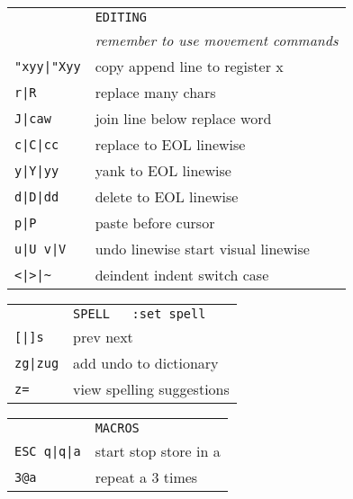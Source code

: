 \begin{tabular}{ll}
&\texttt{EDITING}\\
&\emph{remember to use movement commands}\\
\texttt{"xyy|"Xyy}&copy \textbar{} append line to register x\\
\texttt{r|R}& replace \textbar{} many chars\\
\texttt{J|caw}& join line below \textbar{} replace word\\
\texttt{c|C|cc}& replace \textbar{} to EOL \textbar{} linewise\\
\texttt{y|Y|yy}& yank \textbar{} to EOL \textbar{} linewise\\
\texttt{d|D|dd}& delete \textbar{} to EOL \textbar{} linewise\\
\texttt{p|P}& paste \textbar{} before cursor\\
\texttt{u|U v|V}& undo \textbar{} linewise start visual \textbar{} linewise\\
\texttt{<|>|\~}& deindent \textbar{} indent \textbar{} switch case\\
\end{tabular}

\vfill

\begin{tabular}{ll}
&\texttt{SPELL\ \ \ :set spell}\\
\texttt{[|]s}&prev \textbar{} next\\
\texttt{zg|zug}&add \textbar{} undo to dictionary\\
\texttt{z=}&view spelling suggestions\\
\end{tabular}
\vfill
\begin{tabular}{ll}
&\texttt{MACROS}\\
\texttt{ESC q|q|a}&start \textbar{} stop \textbar{} store in a\\
\texttt{3@a}&repeat a 3 times\\
\end{tabular}

\vfill

